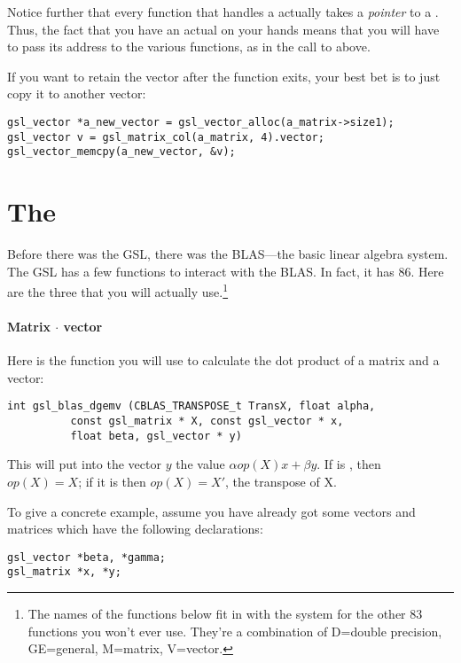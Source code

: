 Notice further that every function that handles a
 actually takes a {\em pointer} to a 
. Thus, the fact that you have an actual 
 on your hands means that you will have to pass
its address to the various functions, as in the call to
 above.

If you want to retain the vector after the function exits, your best bet
is to just copy it to another vector:

\begin{lstlisting}
gsl_vector *a_new_vector = gsl_vector_alloc(a_matrix->size1);
gsl_vector v = gsl_matrix_col(a_matrix, 4).vector;
gsl_vector_memcpy(a_new_vector, &v);
\end{lstlisting}

\section{The } 
Before there was the GSL, there was the BLAS---the basic linear algebra
system. The GSL has a few functions to interact with the BLAS. In fact,
it has 86. Here are the three that you will actually use.\footnote{
The names of the functions below fit in with the system for the other 83
functions you won't ever use. They're a combination of D=double precision,
GE=general, M=matrix, V=vector.}

\paragraph{Matrix $\cdot$ vector} Here is the function you will use to calculate the dot product of a
matrix and a vector:
\begin{lstlisting}
int gsl_blas_dgemv (CBLAS_TRANSPOSE_t TransX, float alpha, 
          const gsl_matrix * X, const gsl_vector * x, 
          float beta, gsl_vector * y)
\end{lstlisting}

This will put into the vector $y$ the value $\alpha op(X) x + \beta y$. 
If  is ,  then $op(X)=X$; if it is
 then $op(X)=X'$, the transpose of X.


To give a concrete example, assume you have already got some vectors and matrices which have the following
declarations:
\begin{lstlisting}
gsl_vector *beta, *gamma;     
gsl_matrix *x, *y;           
\end{lstlisting}

